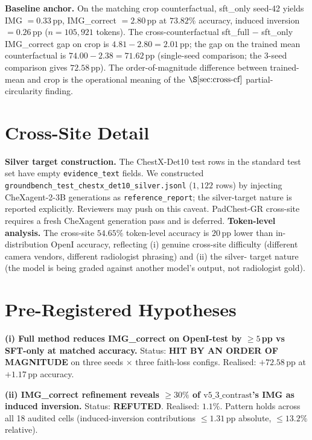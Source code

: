 \documentclass{article}
\begin{document}
\textbf{Baseline anchor.} On the matching crop counterfactual, sft\_only
seed-42 yields IMG $= 0.33$\,pp, IMG\_correct $= 2.80$\,pp at
$73.82\%$ accuracy, induced inversion $= 0.26$\,pp ($n=105{,}921$ tokens).
The cross-counterfactual sft\_full $-$ sft\_only IMG\_correct gap on
crop is $4.81 - 2.80 = 2.01$\,pp; the gap on the trained mean
counterfactual is $74.00 - 2.38 = 71.62$\,pp (single-seed comparison; the
3-seed comparison gives $72.58$\,pp). The order-of-magnitude difference
between trained-mean and crop is the operational meaning of the
$\S\ref{sec:cross-cf}$ partial-circularity finding.

\section{Cross-Site Detail}
\label{app:crosssite}

\textbf{Silver target construction.} The ChestX-Det10 test rows in the
standard test set have empty \texttt{evidence\_text} fields. We constructed
\texttt{groundbench\_test\_chestx\_det10\_silver.jsonl} ($1{,}122$ rows)
by injecting CheXagent-2-3B \citep{chen2024chexagent} generations as
\texttt{reference\_report}; the silver-target nature is reported
explicitly. Reviewers may push on this caveat. PadChest-GR cross-site
\citep{castro2024padchestgr} requires a fresh CheXagent generation pass
and is deferred. \textbf{Token-level analysis.} The cross-site
$54.65\%$ token-level accuracy is $20$\,pp lower than in-distribution
OpenI accuracy, reflecting (i) genuine cross-site difficulty (different
camera vendors, different radiologist phrasing) and (ii) the silver-
target nature (the model is being graded against another model's output,
not radiologist gold).

\section{Pre-Registered Hypotheses}
\label{app:prereg}

\textbf{(i) Full method reduces IMG\_correct on OpenI-test by $\geq 5$\,pp
vs SFT-only at matched accuracy.} Status: \textbf{HIT BY AN ORDER OF
MAGNITUDE} on three seeds $\times$ three faith-loss configs. Realised:
$+72.58$\,pp at $+1.17$\,pp accuracy.

\textbf{(ii) IMG\_correct refinement reveals $\geq 30\%$ of $\mathrm{v5\_3\_contrast}$'s
IMG as induced inversion.} Status: \textbf{REFUTED}. Realised: $1.1\%$.
Pattern holds across all 18 audited cells (induced-inversion contributions
$\le 1.31$\,pp absolute, $\le 13.2\%$ relative).
\end{document}
